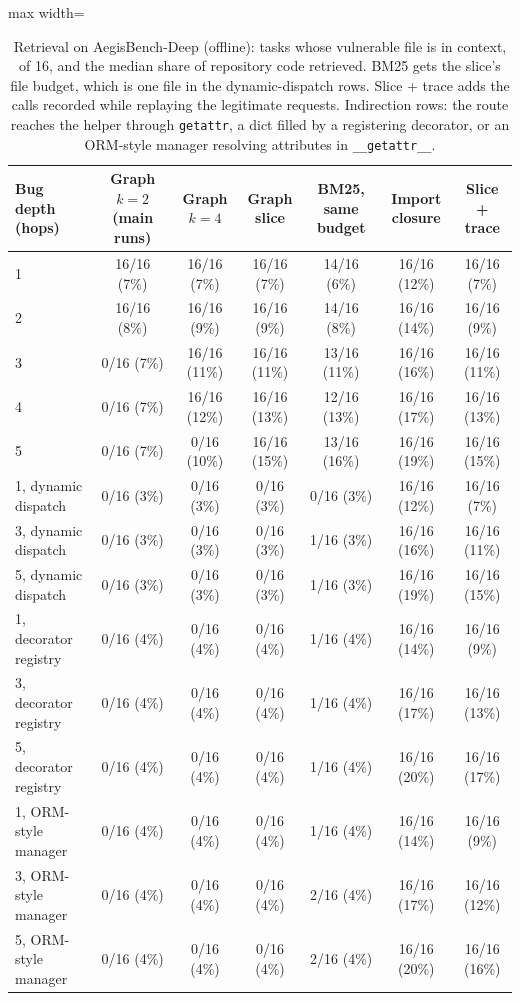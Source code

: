 \documentclass[journal]{IEEEtran}
\newcommand{\code}[1]{\texttt{#1}}
\begin{document}
\begin{table}[!t]
\centering\small
\caption{Retrieval on AegisBench-Deep (offline): tasks whose vulnerable file is in context, of 16, and the median share of repository code retrieved. BM25 gets the slice's file budget, which is one file in the dynamic-dispatch rows. Slice + trace adds the calls recorded while replaying the legitimate requests. Indirection rows: the route reaches the helper through \code{getattr}, a dict filled by a registering decorator, or an ORM-style manager resolving attributes in \code{\_\_getattr\_\_}.}
\label{tab:graph}
\begin{adjustbox}{max width=\linewidth}\begin{tabular}{lcccccc}
\toprule
Bug depth (hops) & Graph $k{=}2$ (main runs) & Graph $k{=}4$ & Graph slice & BM25, same budget & Import closure & Slice + trace\\
\midrule
1 & 16/16 (7\%) & 16/16 (7\%) & 16/16 (7\%) & 14/16 (6\%) & 16/16 (12\%) & 16/16 (7\%)\\
2 & 16/16 (8\%) & 16/16 (9\%) & 16/16 (9\%) & 14/16 (8\%) & 16/16 (14\%) & 16/16 (9\%)\\
3 & 0/16 (7\%) & 16/16 (11\%) & 16/16 (11\%) & 13/16 (11\%) & 16/16 (16\%) & 16/16 (11\%)\\
4 & 0/16 (7\%) & 16/16 (12\%) & 16/16 (13\%) & 12/16 (13\%) & 16/16 (17\%) & 16/16 (13\%)\\
5 & 0/16 (7\%) & 0/16 (10\%) & 16/16 (15\%) & 13/16 (16\%) & 16/16 (19\%) & 16/16 (15\%)\\
1, dynamic dispatch & 0/16 (3\%) & 0/16 (3\%) & 0/16 (3\%) & 0/16 (3\%) & 16/16 (12\%) & 16/16 (7\%)\\
3, dynamic dispatch & 0/16 (3\%) & 0/16 (3\%) & 0/16 (3\%) & 1/16 (3\%) & 16/16 (16\%) & 16/16 (11\%)\\
5, dynamic dispatch & 0/16 (3\%) & 0/16 (3\%) & 0/16 (3\%) & 1/16 (3\%) & 16/16 (19\%) & 16/16 (15\%)\\
1, decorator registry & 0/16 (4\%) & 0/16 (4\%) & 0/16 (4\%) & 1/16 (4\%) & 16/16 (14\%) & 16/16 (9\%)\\
3, decorator registry & 0/16 (4\%) & 0/16 (4\%) & 0/16 (4\%) & 1/16 (4\%) & 16/16 (17\%) & 16/16 (13\%)\\
5, decorator registry & 0/16 (4\%) & 0/16 (4\%) & 0/16 (4\%) & 1/16 (4\%) & 16/16 (20\%) & 16/16 (17\%)\\
1, ORM-style manager & 0/16 (4\%) & 0/16 (4\%) & 0/16 (4\%) & 1/16 (4\%) & 16/16 (14\%) & 16/16 (9\%)\\
3, ORM-style manager & 0/16 (4\%) & 0/16 (4\%) & 0/16 (4\%) & 2/16 (4\%) & 16/16 (17\%) & 16/16 (12\%)\\
5, ORM-style manager & 0/16 (4\%) & 0/16 (4\%) & 0/16 (4\%) & 2/16 (4\%) & 16/16 (20\%) & 16/16 (16\%)\\
\bottomrule
\end{tabular}\end{adjustbox}
\end{table}
\end{document}
